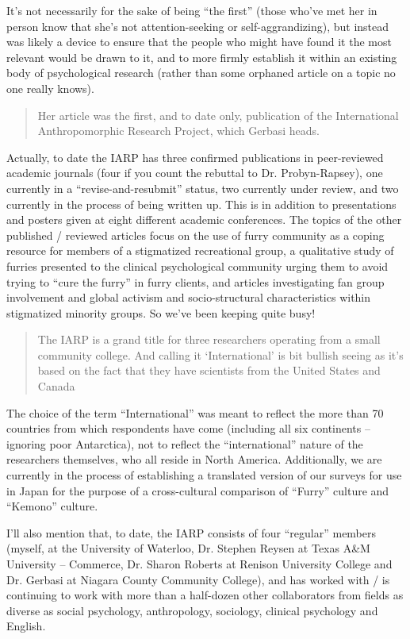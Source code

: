 It's not necessarily for the sake of being ``the first'' (those who've met her in person know that she's not attention-seeking or self-aggrandizing), but instead was likely a device to ensure that the people who might have found it the most relevant would be drawn to it, and to more firmly establish it within an existing body of psychological research (rather than some orphaned article on a topic no one really knows).

\begin{quote}
  Her article was the first, and to date only, publication of the International Anthropomorphic Research Project, which Gerbasi heads.
\end{quote}

Actually, to date the IARP has three confirmed publications in peer-reviewed academic journals (four if you count the rebuttal to Dr. Probyn-Rapsey), one currently in a ``revise-and-resubmit'' status, two currently under review, and two currently in the process of being written up. This is in addition to presentations and posters given at eight different academic conferences. The topics of the other published / reviewed articles focus on the use of furry community as a coping resource for members of a stigmatized recreational group, a qualitative study of furries presented to the clinical psychological community urging them to avoid trying to ``cure the furry'' in furry clients, and articles investigating fan group involvement and global activism and socio-structural characteristics within stigmatized minority groups. So we've been keeping quite busy!

\begin{quote}
  The IARP is a grand title for three researchers operating from a small community college. And calling it `International' is bit bullish seeing as it's based on the fact that they have scientists from the United States and Canada
\end{quote}

The choice of the term ``International'' was meant to reflect the more than 70 countries from which respondents have come (including all six continents -- ignoring poor Antarctica), not to reflect the ``international'' nature of the researchers themselves, who all reside in North America. Additionally, we are currently in the process of establishing a translated version of our surveys for use in Japan for the purpose of a cross-cultural comparison of ``Furry'' culture and ``Kemono'' culture.

I'll also mention that, to date, the IARP consists of four ``regular'' members (myself, at the University of Waterloo, Dr. Stephen Reysen at Texas A&M University – Commerce, Dr. Sharon Roberts at Renison University College and Dr. Gerbasi at Niagara County Community College), and has worked with / is continuing to work with more than a half-dozen other collaborators from fields as diverse as social psychology, anthropology, sociology, clinical psychology and English.

